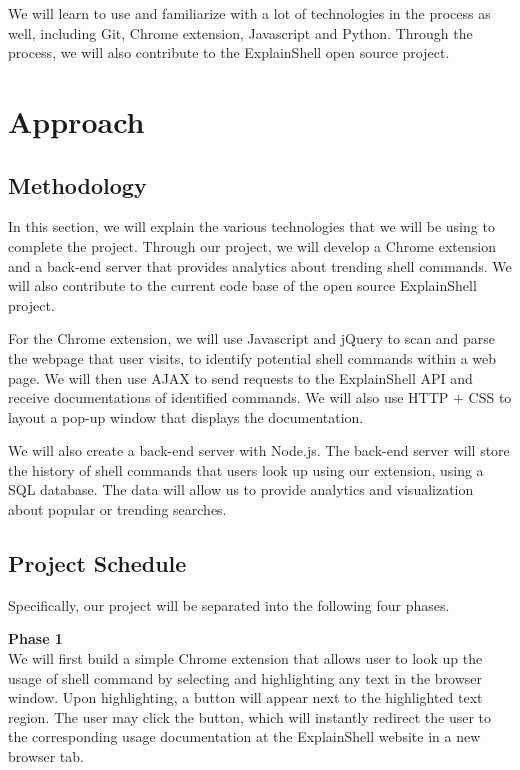 \documentclass[11pt]{article}
\begin{document}
We will learn to use and familiarize with a lot of technologies in the process as well, including Git, Chrome extension, Javascript and Python. Through the process, we will also contribute to the ExplainShell open source project.

\section{Approach}
\subsection{Methodology}

In this section, we will explain the various technologies that we will be using to complete the project. Through our project, we will develop a Chrome extension and a back-end server that provides analytics about trending shell commands. We will also contribute to the current code base of the open source ExplainShell project. 

For the Chrome extension, we will use Javascript and jQuery to scan and parse the webpage that user visits, to identify potential shell commands within a web page. We will then use AJAX to send requests to the ExplainShell API and receive documentations of identified commands. We will also use HTTP + CSS to layout a pop-up window that displays the documentation. 

We will also create a back-end server with Node.js. The back-end server will store the history of shell commands that users look up using our extension, using a SQL database. The data will allow us to provide analytics and visualization about popular or trending searches.

\subsection{Project Schedule}
Specifically, our project will be separated into the following four phases. 

\par{\bf Phase 1}\\ 
We will first build a simple Chrome extension that allows user to look up the usage of shell command by selecting and highlighting any text in the browser window. Upon highlighting, a button will appear next to the highlighted text region. The user may click the button, which will instantly redirect the user to the corresponding usage documentation at the ExplainShell website in a new browser tab.
\end{document}
